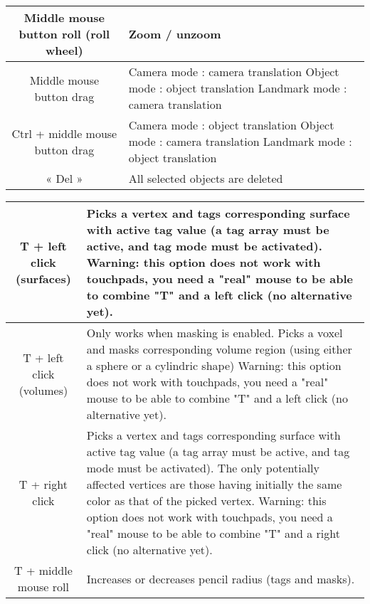 \begin{tabularx}{\linewidth}{ | c | X | }
Middle mouse button roll (roll wheel) & Zoom / unzoom \\ \hline		
	
Middle mouse button drag 
& Camera mode : camera translation\newline
 Object mode : object translation\newline
 Landmark mode : camera translation \\ \hline	
		
Ctrl + middle mouse button drag 
& Camera mode : object translation\newline
Object mode : camera translation\newline
Landmark mode : object translation \\ \hline			

« Del » & All selected objects are deleted \\ \hline			



 \end{tabularx}

\begin{tabularx}{\linewidth}{ | c | X | }
T + left click (surfaces) & Picks a vertex and tags corresponding surface with active tag value (a tag array must be active, and tag mode must be activated). Warning: this option does not work with touchpads, you need a "real" mouse to be able to combine "T" and a left click (no alternative yet).  \\ \hline			
T + left click (volumes) & Only works when masking is enabled. Picks a voxel and masks corresponding volume region (using either a sphere or a cylindric shape) Warning: this option does not work with touchpads, you need a "real" mouse to be able to combine "T" and a left click (no alternative yet).  \\ \hline			 

T + right click & Picks a vertex and tags corresponding surface with active tag value (a tag array must be active, and tag mode must be activated). The only potentially affected vertices are those having initially the same color as that of the picked vertex. Warning: this option does not work with touchpads, you need a "real" mouse to be able to combine "T" and a right click (no alternative yet).  \\ \hline			

T + middle mouse roll & Increases or decreases pencil radius (tags and masks).  \\ \hline			
\end{tabularx}

